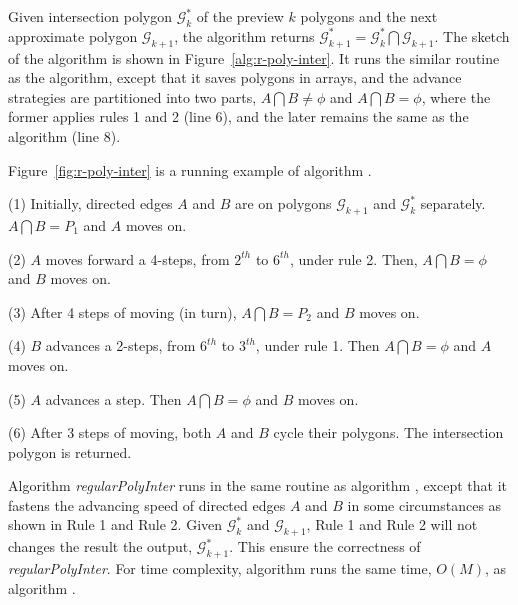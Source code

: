 Given intersection polygon $\mathcal{G}^*_k$ of the preview $k$ polygons and the next approximate polygon $\mathcal{G}_{k+1}$, the algorithm \rpia returns $\mathcal{G}^*_{k+1} = \mathcal{G}^*_k  \bigcap \mathcal{G}_{k+1}$.
The sketch of the algorithm is shown in Figure~\ref{alg:r-poly-inter}.
%
It runs the similar routine as the \cpia algorithm, except that it saves polygons in arrays, and the advance strategies are partitioned into two parts, \ie $A \bigcap B \ne \phi$ and $A \bigcap B = \phi$, where the former applies rules 1 and 2 (line 6), and the later remains the same as the \cpia algorithm (line 8).








\begin{example}
Figure~\ref{fig:r-poly-inter} is a running example of algorithm \rpia.

\ni (1) Initially, directed edges $A$ and $B$ are on polygons $\mathcal{G}_{k+1}$ and $\mathcal{G}^*_{k}$ separately. $A \bigcap B = P_1$ and $A$ moves on.

\ni (2) $A$ moves forward a 4-steps, from $2^{th}$ to $6^{th}$, under rule 2. Then, $A \bigcap B = \phi$ and $B$ moves on.

\ni (3) After 4 steps of moving (in turn), $A \bigcap B = P_2$ and $B$ moves on.

\ni (4) $B$ advances a 2-steps, from $6^{th}$ to $3^{th}$, under rule 1. Then $A \bigcap B = \phi$ and $A$ moves on.

\ni (5) $A$ advances a step. Then $A \bigcap B = \phi$ and $B$ moves on.

\ni (6) After 3 steps of moving, both $A$ and $B$ cycle their polygons. The intersection polygon is returned.
\end{example}



Algorithm \emph{regularPolyInter} runs in the same routine as algorithm \cpia, except that it fastens the advancing speed of directed edges $A$ and $B$ in some circumstances as shown in Rule 1 and Rule 2. Given $\mathcal{G}^*_k$ and $\mathcal{G}_{k+1}$,  Rule 1 and Rule 2 will not changes the result the output, \ie $\mathcal{G}^*_{k+1}$. This ensure the correctness of \emph{regularPolyInter}.
For time complexity, algorithm \rpia runs the same time, $O(M)$, as algorithm \cpia.


